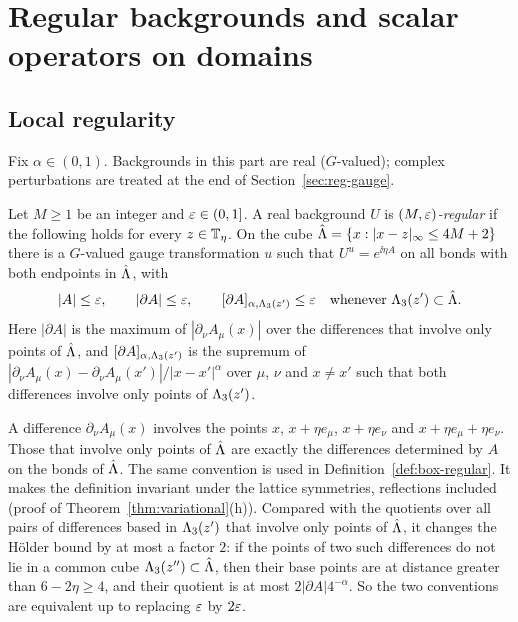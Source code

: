 \section{Regular backgrounds and scalar operators on domains}\label{sec:reg-scalar}

\subsection{Local regularity}\label{ss:18.1}

Fix $\alpha\in(0,1)$. Backgrounds in this part are real ($G$-valued); complex perturbations are treated at the end of Section~\ref{sec:reg-gauge}.

\begin{definition}\label{def:regular}
Let $M\ge1$ be an integer and $\varepsilon\in(0,1]$. A real background $U$ is \emph{$(M,\varepsilon)$-regular} if the following holds for every $z\in\mathbb T_\eta$. On the cube $\hat{\Lambda}=\{x:|x-z|_\infty\le4M+2\}$ there is a $G$-valued gauge transformation $u$ such that $U^u=e^{\ii\eta A}$ on all bonds with both endpoints in $\hat{\Lambda}$, with
\[
|A|\le\varepsilon,\qquad|\partial A|\le\varepsilon,\qquad[\partial A]_{\alpha,\Lambda_3(z')}\le\varepsilon\quad\text{whenever }\Lambda_3(z')\subset\hat{\Lambda} .
\]
Here $|\partial A|$ is the maximum of $|\partial_\nu A_\mu(x)|$ over the differences that involve only points of $\hat{\Lambda}$, and $[\partial A]_{\alpha,\Lambda_3(z')}$ is the supremum of $|\partial_\nu A_\mu(x)-\partial_\nu A_\mu(x')|/|x-x'|^\alpha$ over $\mu$, $\nu$ and $x\ne x'$ such that both differences involve only points of $\Lambda_3(z')$.
\end{definition}

A difference $\partial_\nu A_\mu(x)$ involves the points $x$, $x+\eta e_\mu$, $x+\eta e_\nu$ and $x+\eta e_\mu+\eta e_\nu$. Those that involve only points of $\hat{\Lambda}$ are exactly the differences determined by $A$ on the bonds of $\hat{\Lambda}$. The same convention is used in Definition~\ref{def:box-regular}. It makes the definition invariant under the lattice symmetries, reflections included (proof of Theorem~\ref{thm:variational}(h)). Compared with the quotients over all pairs of differences based in $\Lambda_3(z')$ that involve only points of $\hat{\Lambda}$, it changes the H\"older bound by at most a factor $2$: if the points of two such differences do not lie in a common cube $\Lambda_3(z'')\subset\hat{\Lambda}$, then their base points are at distance greater than $6-2\eta\ge4$, and their quotient is at most $2|\partial A|4^{-\alpha}$. So the two conventions are equivalent up to replacing $\varepsilon$ by $2\varepsilon$.

